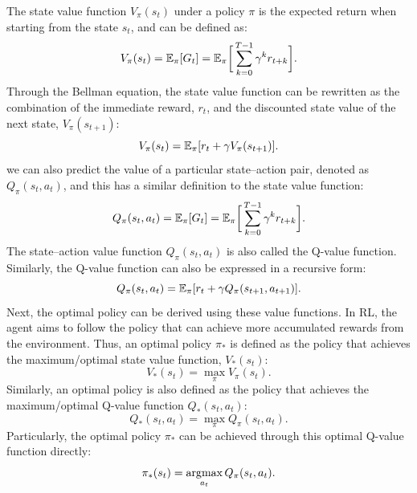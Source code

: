 The state value function $V_{\pi}(s_{t})$ under a policy $\pi$ is the expected return when starting from the state $s_{t}$, and can be defined as:
\begin{equation}
\centering
    V_{\pi}(s_{t}) = \mathbb{E}_{\pi}[G_{t}] = \mathbb{E}_{\pi}\biggr[\sum_{k=0}^{T-1} \gamma^{k}r_{t+k}\biggr].
\end{equation}
Through the Bellman equation, the state value function can be rewritten as the combination of the immediate reward, $r_{t}$, and the discounted state value of the next state, $V_{\pi}(s_{t+1})$:
\begin{equation}
\centering
     V_{\pi}(s_{t}) = \mathbb{E}_{\pi}[r_{t} + \gamma V_{\pi}(s_{t+1})].
\end{equation}
 we can also predict the value of a particular state--action pair, denoted as $Q_{\pi}(s_{t},a_{t})$, and this has a similar definition to the state value function:
\begin{equation}
\centering
     Q_{\pi}(s_{t},a_{t}) = \mathbb{E}_{\pi}[G_{t}] = \mathbb{E}_{\pi}\biggr[\sum_{k=0}^{T-1} \gamma^{k}r_{t+k}\biggr].
\end{equation}
The state--action value function $Q_{\pi}(s_{t},a_{t})$ is also called the Q-value function. Similarly, the Q-value function can also be expressed in a recursive form:
\begin{equation}
\centering
     Q_{\pi}(s_{t},a_{t}) = \mathbb{E}_{\pi}[r_{t} + \gamma Q_{\pi}(s_{t+1}, a_{t+1})].
\end{equation}
Next, the optimal policy can be derived using these value functions. In RL, the agent aims to follow the policy that can achieve more accumulated rewards from the environment. Thus, an optimal policy $\pi_{*}$ is defined as the policy that achieves the maximum/optimal state value function, $V_{*}(s_{t})$:
\begin{equation}
    V_{*}(s_{t}) = \max_{\pi}V_{\pi}(s_{t}).
\end{equation}
Similarly, an optimal policy is also defined as the policy that achieves the maximum/optimal Q-value function $Q_{*}(s_{t},a_{t})$:
\begin{equation}
    Q_{*}(s_{t},a_{t}) = \max_{\pi}Q_{\pi}(s_{t},a_{t}).
\end{equation}
Particularly, the optimal policy $\pi_{*}$ can be achieved through this optimal Q-value function directly:
\begin{equation}
    \pi_{*}(s_{t}) = \operatorname*{\arg\!\max}_{a_{t}} Q_{\pi}(s_{t}, a_{t}).
\end{equation}
